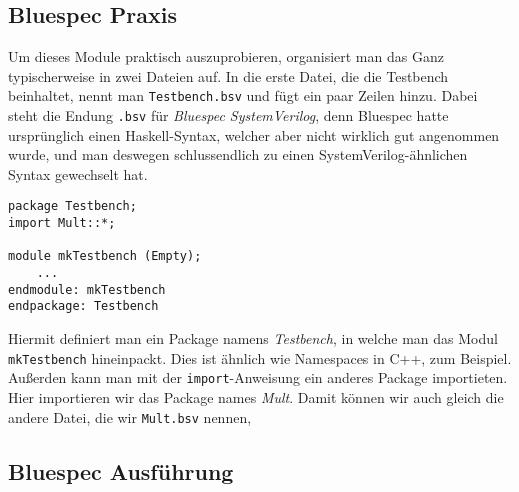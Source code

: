 \documentclass[ngerman]{scrartcl}
\begin{document}

\subsection{Bluespec Praxis}

Um dieses Module praktisch auszuprobieren, organisiert man das Ganz typischerweise in zwei Dateien auf. In die erste Datei, die die Testbench beinhaltet, nennt man \verb|Testbench.bsv| und fügt ein paar Zeilen hinzu. Dabei steht die Endung \verb|.bsv| für \emph{Bluespec SystemVerilog}, denn Bluespec hatte ursprünglich einen Haskell-Syntax, welcher aber nicht wirklich gut angenommen wurde, und man deswegen schlussendlich zu einen SystemVerilog-ähnlichen Syntax gewechselt hat.
\begin{lstlisting}
package Testbench;
import Mult::*;

module mkTestbench (Empty);
    ...
endmodule: mkTestbench
endpackage: Testbench  
\end{lstlisting}
Hiermit definiert man ein Package namens \emph{Testbench}, in welche man das Modul \verb|mkTestbench| hineinpackt. Dies ist ähnlich wie Namespaces in C++, zum Beispiel. Außerden kann man mit der \verb|import|-Anweisung ein anderes Package importieten. Hier importieren wir das Package names \emph{Mult}. Damit können wir auch gleich die andere Datei, die wir \verb|Mult.bsv| nennen, 

\subsection{Bluespec Ausführung}
\end{document}
